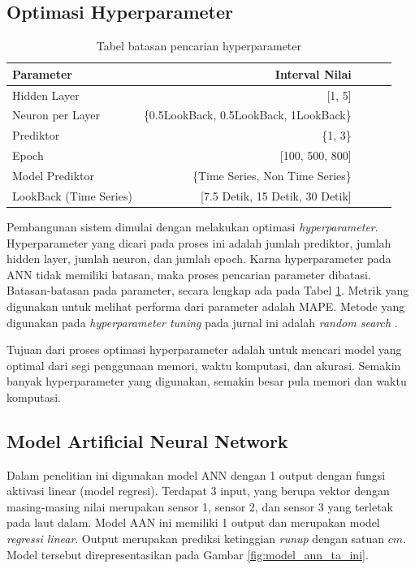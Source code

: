 \subsection{Optimasi Hyperparameter}
\begin{table}[h]
  \begin{center}
    \begin{tabular}{lrrrr}
      \toprule
      Parameter &        Interval Nilai \\
      \midrule
      Hidden Layer            & {[}1, 5{]}     \\
      Neuron per Layer        & \{0.5LookBack, 0.5LookBack, 1LookBack\}    \\
      Prediktor               & \{1, 3\}       \\
      Epoch                   & {[}100, 500, 800{]} \\
      Model Prediktor         & \{Time Series, Non Time Series\} \\
      LookBack (Time Series)  & {[}7.5 Detik, 15 Detik, 30 Detik{]}\\
      \bottomrule
    \end{tabular}
  \end{center}
  \caption{Tabel batasan pencarian hyperparameter}\label{tab:batasanParameter}
\end{table}

Pembangunan sistem dimulai dengan melakukan optimasi \emph{hyperparameter}. Hyperparameter yang dicari pada proses ini adalah jumlah prediktor, jumlah hidden layer, jumlah neuron, dan jumlah epoch. Karna hyperparameter pada ANN tidak memiliki batasan, maka proses pencarian parameter dibatasi. Batasan-batasan pada parameter, secara lengkap ada pada Tabel \ref{tab:batasanParameter}. Metrik yang digunakan untuk melihat performa dari parameter adalah MAPE. Metode yang digunakan pada \emph{hyperparameter tuning} pada jurnal ini adalah \emph{random search} \cite{bergstra_random_nodate}.

Tujuan dari proses optimasi hyperparameter adalah untuk mencari model yang optimal dari segi penggunaan memori, waktu komputasi, dan akurasi. Semakin banyak hyperparameter yang digunakan, semakin besar pula memori dan waktu komputasi.

\subsection{Model Artificial Neural Network}
Dalam penelitian ini digunakan model ANN dengan 1 output dengan fungsi aktivasi linear (model regresi). Terdapat 3 input, yang berupa vektor dengan masing-masing nilai merupakan sensor 1, sensor 2, dan sensor 3 yang terletak pada laut dalam. Model AAN ini memiliki 1 output dan merupakan model \emph{regressi linear}. Output merupakan prediksi ketinggian \emph{runup} dengan satuan $cm$. Model tersebut direpresentasikan pada Gambar \ref{fig:model_ann_ta_ini}.


